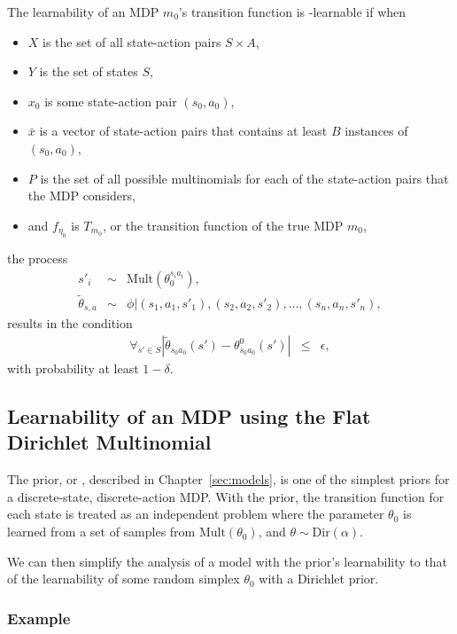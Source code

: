 The learnability of an MDP $m_0$'s transition function is \bed-learnable if when
\begin{itemize}
\item $X$ is the set of all state-action pairs $S\times A$,
\item $Y$ is the set of states $S$,
\item $x_0$ is some state-action pair $(s_0, a_0)$,
\item $\bar x$ is a vector of state-action pairs that contains at least $B$ instances of $(s_0,a_0)$,
\item $P$ is the set of all possible multinomials for each of the state-action pairs that the MDP considers,
\item and $f_{\eta_0}$ is $T_{m_0}$, or the transition function of the true MDP $m_0$,
\end{itemize}
the process
\begin{eqnarray}
s'_i &\sim& \mbox{Mult}(\theta_0^{s_i a_i}),\\
\tilde \theta_{s,a} &\sim& \phi|(s_1,a_1,s'_1),(s_2,a_2,s'_2),...,(s_n,a_n,s'_n),
\end{eqnarray}
results in the condition
\begin{eqnarray}
\forall_{s'\in S} |\tilde\theta_{s_0 a_0}(s') - \theta^0_{s_0 a_0}(s')| & \leq & \epsilon,
\end{eqnarray}
with probability at least $1-\delta$.

\subsection{Learnability of an MDP using the Flat Dirichlet Multinomial}

The  prior, or , described in Chapter~\ref{sec:models}, is one of the simplest priors for a discrete-state, discrete-action MDP. With the  prior, the transition function for each state is treated as an independent problem where the parameter $\theta_0$ is learned from a set of samples from $\mbox{Mult}(\theta_0)$, and $\theta \sim \mbox{Dir}(\alpha)$.

We can then simplify the analysis of a model with the  prior's learnability to that of the learnability of some random simplex $\theta_0$ with a Dirichlet prior.

\subsubsection{Example}

